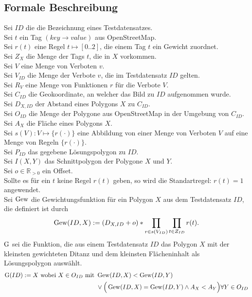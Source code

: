 \subsection{Formale Beschreibung}
Sei $ID$ die die Bezeichnung eines Testdatensatzes.\\
Sei $t$ ein Tag $(key \to value)$ aus OpenStreetMap.\\
Sei $r(t)$ eine Regel $t \mapsto [0..2]$, die einem Tag $t$ ein Gewicht zuordnet. \\
Sei $Z_{X}$ die Menge der Tags $t$, die in $X$ vorkommen.\\
Sei $V$ eine Menge von Verboten $v$.\\
Sei $V_{ID}$ die Menge der Verbote $v$, die im Testdatensatz $ID$ gelten.\\
Sei $R_V$ eine Menge von Funktionen $r$ für die Verbote $V$.\\
Sei $C_{ID}$ die Geokoordinate, an welcher das Bild zu $ID$ aufgenommen wurde. \\
Sei $D_{X,ID}$ der Abstand eines Polygons $X$ zu $C_{ID}$. \\
Sei $O_{ID}$ die Menge der Polygone aus OpenStreetMap in der Umgebung von $C_{ID}$.\\
Sei $A_{X}$ die Fläche eines Polygons $X$.\\
Sei $s(V) : V \mapsto \{r(\cdot)\}$  eine Abbildung von einer Menge von Verboten $V$ auf eine Menge von Regeln $\{r(\cdot)\}$.\\
Sei $P_{ID}$ das gegebene Lösungspolygon zu $ID$.\\
Sei $I(X,Y)$ das Schnittpolygon der Polygone $X$ und $Y$.\\
Sei $o \in \mathbb R _{>0}$ ein Offset.\\
Sollte es für ein $t$ keine Regel $r(t)$ geben, so wird die Standartregel:
$r(t) = 1$ angewendet.\\
Sei $\operatorname{Gew}$ die Gewichtungsfunktion für ein Polygon $X$ aus dem Testdatensatz $ID$, die definiert ist durch
\begin{equation}
\operatorname{Gew}(ID,X) := (D_{X,ID} + o) * \prod_{r \in s(V_{ID})} \prod_{t \in Z_{ID}} r(t).
\end{equation}
$\operatorname{G}$ sei die Funktion, die aus einem Testdatensatz $ID$ das Polygon $X$ mit der kleinsten gewichteten Ditanz und dem 
kleinsten Flächeninhalt als Lösungspolygon auswählt. 
\begin{align}
\operatorname{G}(ID) := X \text{ wobei } X \in O_{ID} \text{ mit } & \operatorname{Gew}(ID,X) < \operatorname{Gew}(ID,Y)\\
& \lor \Big(\operatorname{Gew}(ID,X)=\operatorname{Gew}(ID,Y) \land A_X < A_Y\Big) \forall Y \in O_{ID} \notag
\end{align}


